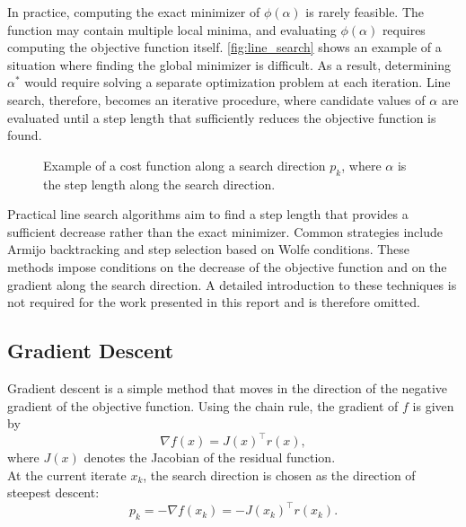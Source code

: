 In practice, computing the exact minimizer of $\phi(\alpha)$ is rarely feasible. The function may contain multiple local minima, and evaluating $\phi(\alpha)$ requires computing the objective function itself. \autoref{fig:line_search} shows an example of a situation where finding the global minimizer is difficult. As a result, determining $\alpha^\ast$ would require solving a separate optimization problem at each iteration. Line search, therefore, becomes an iterative procedure, where candidate values of $\alpha$ are evaluated until a step length that sufficiently reduces the objective function is found.\\

\begin{figure}[ht]
    \centering
    
    \caption[Example of cost function for line search]{Example of a cost function along a search direction $p_k$, where $\alpha$ is the step length along the search direction.}
    \label{fig:line_search}
\end{figure}

Practical line search algorithms aim to find a step length that provides a sufficient decrease rather than the exact minimizer. Common strategies include Armijo backtracking and step selection based on Wolfe conditions. These methods impose conditions on the decrease of the objective function and on the gradient along the search direction. A detailed introduction to these techniques is not required for the work presented in this report and is therefore omitted.



\subsection{Gradient Descent}
Gradient descent \cite{madsen2004} is a simple method that moves in the direction of the negative gradient of the objective function. 
Using the chain rule, the gradient of $f$ is given by
\begin{equation}
\label{eq:gradient_f}
    \nabla f(x) = J(x)^\top r(x),
\end{equation}
where $J(x)$ denotes the Jacobian of the residual function.\\

At the current iterate $x_k$, the search direction is chosen as the direction of steepest descent:
\begin{equation}
\label{eq:steepest_descent}
    p_k = - \nabla f(x_k) = - J(x_k)^\top r(x_k).
\end{equation}

